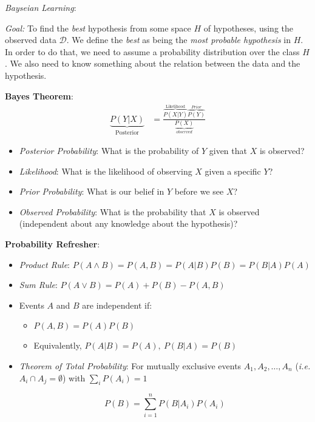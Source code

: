 \documentclass{article}
\renewcommand{\dim}{\mathcal{D}}
\begin{document}
{\em Bayseian Learning}:

{\em Goal:} To find the {\em best} hypothesis from some space $H$ of hypotheses, using the observed data $\dim$. We define the {\em best} as being the {\em most probable hypothesis} in $H$. In order to do that, we need to assume a probability distribution over the class $H$. We also need to know something about the relation between the data and the hypothesis. 

{\bf Bayes Theorem}:
\begin{align}
\underbrace{P(Y|X)}_{\text{Posterior}} &= \frac{\overbrace{P(X|Y)}^{\text{Likelihood}}\overbrace{P(Y)}^{Prior}}{\underbrace{P(X)}_{observed}}
\end{align}
\begin{itemize}
\item {\em Posterior Probability}: What is the probability of $Y$ given that $X$ is observed?
\item {\em Likelihood}: What is the likelihood of observing $X$ given a specific $Y$?
\item {\em Prior Probability}: What is our belief in $Y$ before we see $X$?
\item {\em Observed Probability}: What is the probability that $X$ is observed (independent about any knowledge about the hypothesis)?
\end{itemize}

{\bf Probability Refresher}:
\begin{itemize}
\item {\em Product Rule}: $P(A\wedge B) = P(A,B) = P(A|B)P(B) = P(B|A)P(A)$
\item {\em Sum Rule}: $P(A\vee B) = P(A) + P(B) - P(A,B)$
\item Events $A$ and $B$ are independent if:
\begin{itemize}
\item $P(A,B) = P(A)P(B)$
\item Equivalently, $P(A|B) = P(A),\ P(B|A)=P(B)$
\end{itemize}
\item {\em Theorem of Total Probability}: For mutually exclusive events $A_{1},A_{2},\ldots,A_{n}$ ({\em i.e.} $A_{i}\cap A_{j} = \emptyset$) with $\sum_{i}P(A_{i})= 1$

\[
P(B) = \sum_{i=1}^{n}P(B|A_{i})P(A_{i})
\]

\end{itemize}
\end{document}
